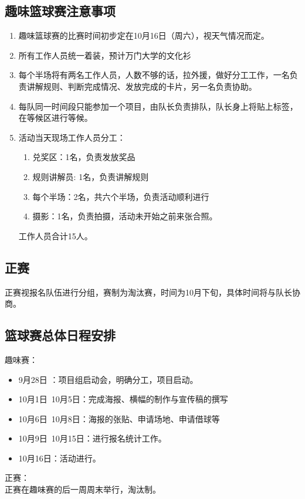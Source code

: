 \documentclass{article}
\begin{document}
\begin{CJK}{UTF8}{gbsn}
		\subsection{趣味篮球赛注意事项}
		\begin{enumerate}
			\item 趣味篮球赛的比赛时间初步定在10月16日（周六），视天气情况而定。
			\item 所有工作人员统一着装，预计万门大学的文化衫
			\item 每个半场将有两名工作人员，人数不够的话，拉外援，做好分工工作，一名负责讲解规则、判断完成情况、发放完成的卡片，另一名负责协助。
			\item 每队同一时间段只能参加一个项目，由队长负责排队，队长身上将贴上标签，在等候区进行等候。
			\item 活动当天现场工作人员分工：
			\begin{enumerate}
				\item 兑奖区：1名，负责发放奖品
				\item 规则讲解员: 1名，负责讲解规则
				\item 每个半场：2名，共六个半场，负责活动顺利进行
				\item 摄影：1名，负责拍摄，活动未开始之前来张合照。
			\end{enumerate}
			工作人员合计15人。
		\end{enumerate}
		
		\subsection{正赛}
		正赛视报名队伍进行分组，赛制为淘汰赛，时间为10月下旬，具体时间将与队长协商。
		\subsection{篮球赛总体日程安排}
		趣味赛：
		\begin{itemize}
			\item 9月28日	：项目组启动会，明确分工，项目启动。
			\item 10月1日~10月5日：完成海报、横幅的制作与宣传稿的撰写
			\item 10月6日~10月8日：海报的张贴、申请场地、申请借球等
			\item 10月9日~10月15日：进行报名统计工作。
			\item 10月16日：活动进行。
		\end{itemize}
		正赛：\\
		正赛在趣味赛的后一周周末举行，淘汰制。
		

\end{CJK}
\end{document}
